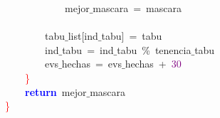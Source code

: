 \mbox{}\ \ \ \ \ \ \ \ \ \ \ \ mejor$\_$mascara\ \textcolor{BrickRed}{=}\ mascara \\
\mbox{} \\
\mbox{}\ \ \ \ \ \ \ \ tabu$\_$list\textcolor{BrickRed}{[}ind$\_$tabu\textcolor{BrickRed}{]}\ \textcolor{BrickRed}{=}\ tabu \\
\mbox{}\ \ \ \ \ \ \ \ ind$\_$tabu\ \textcolor{BrickRed}{=}\ ind$\_$tabu\ \textcolor{BrickRed}{\%}\ tenencia$\_$tabu \\
\mbox{}\ \ \ \ \ \ \ \ evs$\_$hechas\ \textcolor{BrickRed}{=}\ evs$\_$hechas\ \textcolor{BrickRed}{+}\ \textcolor{Purple}{30} \\
\mbox{}\ \ \ \ \textcolor{Red}{\}} \\
\mbox{}\ \ \ \ \textbf{\textcolor{Blue}{return}}\ mejor$\_$mascara \\
\mbox{}\textcolor{Red}{\}} \\
\mbox{}
